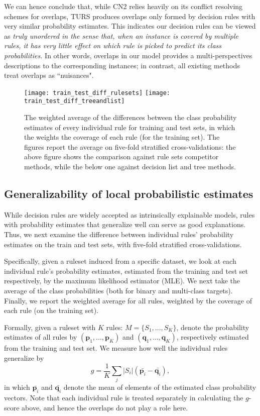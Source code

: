 We can hence conclude that, while CN2 relies heavily on its conflict resolving schemes for overlaps, TURS produces overlaps only formed by decision rules with very similar probability estimates. This indicates our decision rules can be viewed as \emph{truly unordered in the sense that, when an instance is covered by multiple rules, it has very little effect on which rule is picked to predict its class probabilities.} In other words, overlaps in our model provides a multi-perspectives descriptions to the corresponding instances; in contrast, all existing methods treat overlaps as ``nuisances". 

\begin{figure}[ht]\centering
\texttt{[image: train\_test\_diff\_rulesets]}
\texttt{[image: train\_test\_diff\_treeandlist]}
\caption{The weighted average of the differences between the class probability estimates of every individual rule for training and test sets, in which the weights the coverage of each rule (for the training set). The figures report the average on five-fold stratified cross-validations: the above figure shows the comparison against rule sets competitor methods, while the below one against decision list and tree methods.}
\label{fig:train_test_diff}
\end{figure}
\subsection{Generalizability of local probabilistic estimates}
While decision rules are widely accepted as intrinsically explainable models, rules with probability estimates that generalize well can serve as good explanations. Thus, we next examine the difference between individual rules' probability estimates on the train and test sets, with five-fold stratified cross-validations. 

Specifically, given a ruleset induced from a specific dataset, we look at each individual rule's probability estimates, estimated from the training and test set respectively, by the maximum likelihood estimator (MLE). We next take the average of the class probabilities (both for binary and multi-class targets). Finally, we report the weighted average for all rules, weighted by the coverage of each rule (on the training set). 

Formally, given a ruleset with $K$ rules: $M = \{S_1, ..., S_K\}$, denote the probability estimates of all rules by $(\mathbf{p}_1, ..., \mathbf{p}_K)$ and $(\mathbf{q}_1, ..., \mathbf{q}_K)$, respectively estimated from the training and test set. We measure how well the individual rules generalize by
\begin{equation} \label{eq:train_test_diff}
	g = \frac{1}{K}\sum_{j} |S_i| (\bar{\mathbf{p}_i} - \bar{\mathbf{q}_i}),
\end{equation}
in which $\bar{\mathbf{p}_i}$ and $\bar{\mathbf{q}_i}$ denote the mean of elements of the estimated class probability vectors. Note that each individual rule is treated separately in calculating the $g$-score above, and hence the overlaps do not play a role here. 

